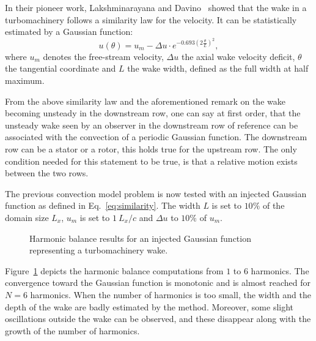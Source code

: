 In their pioneer work, 
Lakshminarayana and Davino~\cite{Lakshminarayana1980} showed that the wake
in a turbomachinery follows a similarity law for the velocity. 
It can be statistically estimated by a Gaussian function:
\begin{equation}
    u (\theta) = u_m - 
        \Delta u \cdot e^{
          -0.693 \left( 2 \frac{\theta}{L} \right) ^ 2},
    \label{eq:similarity}
\end{equation}
where $u_m$ denotes the free-stream velocity, $\Delta u$ the axial wake velocity deficit,
$\theta$ the tangential coordinate and $L$ the wake width,
defined as the full width at half maximum.

From the above similarity law and the aforementioned remark on 
the wake becoming unsteady in the downstream row, one can say at 
first order, that the unsteady wake seen by an observer in the downstream row
of reference can be associated with the convection of a periodic 
Gaussian function. The downstream row can be a stator or a rotor,
this holds true for the upstream row. The only condition needed for
this statement to be true, is that a relative motion exists
between the two rows.

The previous convection model problem is now tested
with an injected Gaussian function as defined in Eq.~\eqref{eq:similarity}.
The width $L$ is set to $10\%$ of the domain size $L_x$, 
$u_m$ is set to $1~L_x / c$ and $\Delta u$ to $10\%$ of $u_m$.

\begin{figure}[htbp]
  \centering
  \caption{Harmonic balance results for 
  an injected Gaussian function representing a turbomachinery wake.}
  \label{fig:inj_wake_results}
\end{figure}
Figure~\ref{fig:inj_wake_results} depicts the harmonic balance
computations from $1$ to $6$ harmonics. The convergence toward
the Gaussian function is monotonic and is almost reached
for $N=6$ harmonics. When the number of harmonics is
too small, the width and the depth of the wake are badly estimated
by the method. Moreover, some slight oscillations outside the wake
can be observed, and these disappear along with the growth of the
number of harmonics.

